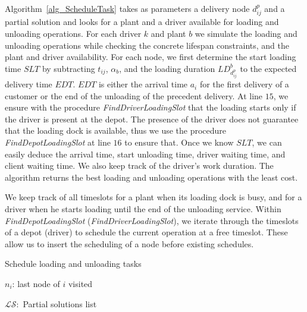 \documentclass{article}
\begin{document}
{ Algorithm~\ref{alg_ScheduleTask} takes as parameters a delivery node $d^p_{ij}$ and a partial solution and looks for a plant and a driver available for loading and unloading operations. For each driver $k$ and plant $b$ we simulate the loading and unloading operations while checking the concrete lifespan constraints, and the plant and driver availability. For each node, we first determine the start loading time $SLT$ by subtracting $t_{ij}$, $\alpha_b$, and the loading duration $LD^b_{d^p_{ij}}$ to the expected delivery time $EDT$. $EDT$ is either the arrival time $a_i$ for the first delivery of a customer or the end of the unloading of the precedent delivery. At line $15$, we ensure with the procedure \textit{ FindDriverLoadingSlot} that the loading starts only if the driver is present at the depot. The presence of the driver does not guarantee that the loading dock is available, thus we use the procedure \textit{FindDepotLoadingSlot} at line $16$ to ensure that. Once we know $SLT$, we can easily deduce the arrival time, start unloading time, driver waiting time, and client waiting time. We also keep track of the driver's work duration. The algorithm returns the best loading and unloading operations with the least cost.  
 
 We keep track of all timeslots for a plant when its loading dock is busy, and for a driver when he starts loading until the end of the unloading service. Within \textit{FindDepotLoadingSlot} (\textit{FindDriverLoadingSlot}), we iterate through the timeslots of a depot (driver) to schedule the current operation at a free timeslot. These allow us to insert the scheduling of a node before existing schedules.
 
{
    {\small
        \begin{algorithm}[htb]
            \caption{Schedule loading and unloading tasks }
            \label{alg_ScheduleTask}
            \LinesNumbered
            \setcounter{AlgoLine}{0}
            
            {
            $n_i$: last node of $i$ visited

            $\mathcal{LS}:$ Partial solutions list
            
}
\end{algorithm}}}}
\end{document}
